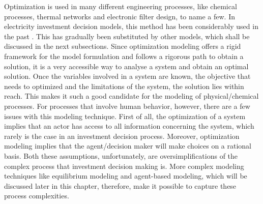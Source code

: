 Optimization is used in many different engineering processes, like chemical processes, thermal networks and electronic filter design, to name a few. In electricity investment decision models, this method has been considerably used in the past \cite{Optimization1,Optimization2,Optimization3}. This has gradually been substituted by other models, which shall be discussed in the next subsections. Since optimization modeling offers a rigid framework for the model formulation and follows a rigorous path to obtain a solution, it is a very accessible way to analyse a system and obtain an optimal solution. Once  the variables involved in a system are known, the objective that needs to optimized and the limitations of the system, the solution lies within reach. This makes it such a good candidate for the modeling of physical/chemical processes. For processes that involve human behavior, however, there are a few issues with this modeling technique. First of all, the optimization of a system implies that an actor has access to all information concerning the system, which rarely is the case in an investment decision process. Moreover, optimization modeling implies that the agent/decision maker will make choices on a rational basis. Both these assumptions, unfortunately, are oversimplifications of the complex process that investment decision making is. More complex modeling techniques like equilibrium modeling and agent-based modeling, which will be discussed later in this chapter, therefore, make it possible to capture these process complexities.  
